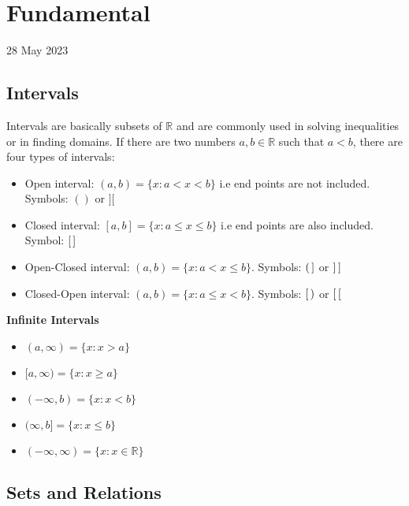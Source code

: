 \documentclass[twocolumn, 10pt]{article}
\begin{document}
\section{Fundamental}
28 May 2023
\subsection{Intervals}
Intervals are basically subsets of $\mathbb{R}$ and are commonly used in solving inequalities or in finding domains. If there are two numbers $a, b \in \mathbb{R}$ such that $a < b$, there are four types of intervals: 
\begin{itemize}
\item Open interval: $(a,b)=\{x:a<x<b\}$ i.e end points are not included. Symbols: $()$ or $][$
\item Closed interval: $[a,b]=\{x:a \le x \le b\}$ i.e end points are also included. Symbol: $[ \thinspace]$
\item Open-Closed interval: $(a,b)=\{x:a<x \le b\}$. Symbols: $( \thinspace ]$ or $]\thinspace]$
\item Closed-Open interval: $(a,b)=\{x:a \le x <b\}$. Symbols: $[ \thinspace )$ or $[\thinspace[$
\end{itemize}
\textbf{Infinite Intervals}
\begin{itemize}
\item $(a,\infty)= \{x:x>a\}$
\item $[a,\infty)=\{x:x \ge a\}$
\item $(-\infty,b)=\{x:x<b\}$
\item $(\infty,b]=\{x:x \le b\}$
\item $(-\infty,\infty)=\{x:x \in \mathbb{R}\}$
\end{itemize}
\subsection{Sets and Relations}
\end{document}
